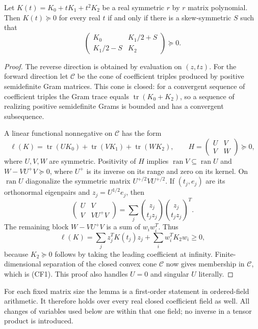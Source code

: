 \begin{lemma}
\label{lem:quadratic-matrix-lift}
Let $K(t)=K_0+tK_1+t^2K_2$ be a real symmetric $r$ by $r$ matrix
polynomial. Then $K(t)\succeq0$ for every real $t$ if and only if
there is a skew-symmetric $S$ such that
\[
 \begin{pmatrix}
 K_0&K_1/2+S\\ K_1/2-S&K_2
 \end{pmatrix}\succeq0.                         \tag{CF1}
\]
\end{lemma}
\begin{proof}
The reverse direction is obtained by evaluation on $(z,tz)$.
For the forward direction let $\mathcal C$ be the cone of coefficient
triples produced by positive semidefinite Gram matrices. This cone is
closed: for a convergent sequence of coefficient triples the Gram
trace equals $\operatorname{tr}(K_0+K_2)$, so a sequence of realizing
positive semidefinite Grams is bounded and has a convergent subsequence.

A linear functional nonnegative on $\mathcal C$ has the form
\[
 \ell(K)=\operatorname{tr}(U K_0)+\operatorname{tr}(V K_1)
                         +\operatorname{tr}(W K_2),\qquad
 H=\begin{pmatrix}U&V\\V&W\end{pmatrix}\succeq0,
                                                        \tag{CF2}
\]
where $U,V,W$ are symmetric. Positivity of $H$ implies
$\operatorname{ran}V\subseteq\operatorname{ran}U$ and
$W-VU^+V\succeq0$, where $U^+$ is its inverse on its range and
zero on its kernel. On $\operatorname{ran}U$ diagonalize the symmetric
matrix $U^{+/2}VU^{+/2}$. If $(t_j,e_j)$ are its orthonormal
eigenpairs and $z_j=U^{1/2}e_j$, then
\[
 \begin{pmatrix}U&V\\V&VU^+V\end{pmatrix}
   =\sum_j\binom{z_j}{t_jz_j}\binom{z_j}{t_jz_j}^{\!T}.       \tag{CF3}
\]
The remaining block $W-VU^+V$ is a sum of $w_iw_i^T$. Thus
\[
 \ell(K)=\sum_j z_j^TK(t_j)z_j+\sum_iw_i^TK_2w_i\ge0,
\]
because $K_2\succeq0$ follows by taking the leading coefficient at
infinity. Finite-dimensional separation of the closed convex cone
$\mathcal C$ now gives membership in $\mathcal C$, which is (CF1).
This proof also handles $U=0$ and singular $U$ literally.
\end{proof}

For each fixed matrix size the lemma is a first-order statement in
ordered-field arithmetic. It therefore holds over every real closed
coefficient field as well. All changes of variables used below are
within that one field; no inverse in a tensor product is introduced.

